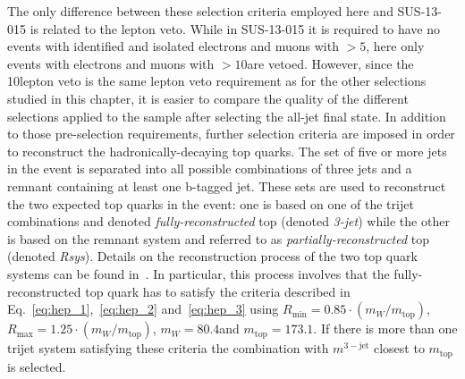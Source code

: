 The only difference between these selection criteria employed here and SUS-13-015 is related to the lepton veto. While in SUS-13-015 it is required to have no events with identified and isolated electrons and muons with \pt$> 5$\gev, here only events with electrons and muons with \pt$> 10$\gev are vetoed. However, since the 10\gev lepton veto is the same lepton veto requirement as for the other selections studied in this chapter, it is easier to compare the quality of the different selections applied to the sample after selecting the all-jet final state. In addition to those pre-selection requirements, further selection criteria are imposed in order to reconstruct the hadronically-decaying top quarks. The set of five or more jets in the event is separated into all possible combinations of three jets and a remnant containing at least one b-tagged jet. These sets are used to reconstruct the two expected top quarks in the event: one is based on one of the trijet combinations and denoted \textit{fully-reconstructed} top (denoted \textit{3-jet}) while the other is based on the remnant system and referred to as \textit{partially-reconstructed} top (denoted \textit{Rsys}). Details on the reconstruction process of the two top quark systems can be found in~\cite{CMS-PAS-SUS-13-015}. In particular, this process involves that the fully-reconstructed top quark has to satisfy the criteria described in Eq.~\ref{eq:hep_1},~\ref{eq:hep_2} and~\ref{eq:hep_3} using $R_\mathrm{min} = 0.85 \cdot (m_W/m_\mathrm{top})$, $R_\mathrm{max} = 1.25 \cdot (m_W/m_\mathrm{top})$, $m_W = 80.4$\gev and $m_\mathrm{top} = 173.1$\gev. If there is more than one trijet system satisfying these criteria the combination with $m^{3-\mathrm{jet}}$ closest to $m_\mathrm{top}$ is selected. 
